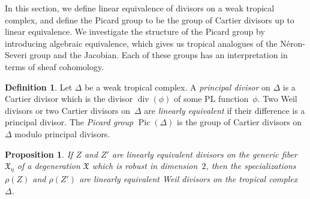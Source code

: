 \documentclass[11pt,reqno]{amsart}
\newtheorem{prop}[thm]{Proposition}
\theoremstyle{definition}
\newtheorem{defn}[thm]{Definition}
\newcommand{\defi}[1]{\emph{#1}}
\renewcommand{\div}{\operatorname{div}}
\newcommand{\Pic}{\operatorname{Pic}}
\newcommand{\X}{\mathfrak X}
\begin{document}
In this section, we define linear equivalence of divisors on a weak tropical
complex, and define the Picard group to be the group of Cartier divisors up
to linear equivalence. We investigate the structure of the Picard group by
introducing algebraic equivalence, which gives us tropical analogues of the
N\'eron-Severi group and the Jacobian. Each of these groups has an
interpretation in terms of sheaf cohomology.

\begin{defn}
Let $\Delta$ be a weak tropical complex. A \defi{principal divisor} on $\Delta$
is a Cartier divisor which is the divisor $\div(\phi)$ of some PL function~$\phi$. Two Weil
divisors or two Cartier divisors on~$\Delta$ are \defi{linearly equivalent} if
their difference is a principal divisor. The \defi{Picard group} $\Pic(\Delta)$
is the group of Cartier divisors on $\Delta$ modulo principal divisors.
\end{defn}

\begin{prop}\label{p:linear-equivalence-trop}
If $Z$ and $Z'$ are linearly equivalent divisors on the generic fiber $\X_\eta$
of a degeneration $\X$ which is robust in dimension~$2$, then the
specializations $\rho(Z)$ and $\rho(Z')$ are linearly equivalent Weil divisors
on the tropical complex~$\Delta$.
\end{prop}
\end{document}
